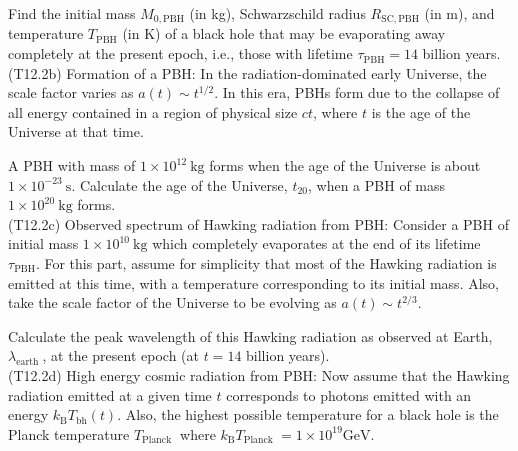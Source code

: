 \documentclass[10pt]{article}
\begin{document}
    Find the initial mass $M_{0, \mathrm{PBH}}$ (in kg), Schwarzschild radius $R_{\mathrm{SC}, \mathrm{PBH}}$ (in m), and temperature $T_{\mathrm{PBH}}$ (in K) of a black hole that may be evaporating away completely at the present epoch, i.e., those with lifetime $\tau_{\mathrm{PBH}}=14$ billion years.\\
    (T12.2b) Formation of a PBH: In the radiation-dominated early Universe, the scale factor varies as $a(t) \sim t^{1 / 2}$. In this era, PBHs form due to the collapse of all energy contained in a region of physical size $c t$, where $t$ is the age of the Universe at that time.
    
    A PBH with mass of $1 \times 10^{12} \mathrm{~kg}$ forms when the age of the Universe is about $1 \times 10^{-23} \mathrm{~s}$. Calculate the age of the Universe, $t_{20}$, when a PBH of mass $1 \times 10^{20} \mathrm{~kg}$ forms.\\
    (T12.2c) Observed spectrum of Hawking radiation from PBH: Consider a PBH of initial mass $1 \times 10^{10} \mathrm{~kg}$ which completely evaporates at the end of its lifetime $\tau_{\mathrm{PBH}}$. For this part, assume for simplicity that most of the Hawking radiation is emitted at this time, with a temperature corresponding to its initial mass. Also, take the scale factor of the Universe to be evolving as $a(t) \sim t^{2 / 3}$.
    
    Calculate the peak wavelength of this Hawking radiation as observed at Earth, $\lambda_{\text {earth }}$, at the present epoch (at $t=14$ billion years).\\
    (T12.2d) High energy cosmic radiation from PBH: Now assume that the Hawking radiation emitted at a given time $t$ corresponds to photons emitted with an energy $k_{\mathrm{B}} T_{\mathrm{bh}}(t)$. Also, the highest possible temperature for a black hole is the Planck temperature $T_{\text {Planck }}$ where $k_{\mathrm{B}} T_{\text {Planck }}=1 \times 10^{19} \mathrm{GeV}$.
    
\end{document}
